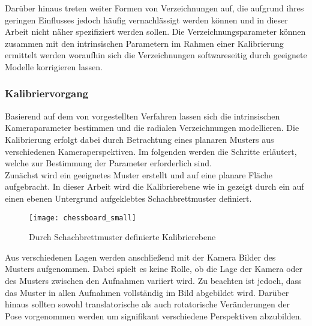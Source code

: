 
Darüber hinaus treten weiter Formen von Verzeichnungen auf, die aufgrund ihres geringen Einflusses jedoch häufig vernachlässigt werden können und in dieser Arbeit nicht näher spezifiziert werden sollen. Die Verzeichnungsparameter können zusammen mit den intrinsischen Parametern im Rahmen einer Kalibrierung ermittelt werden woraufhin sich die Verzeichnungen softwareseitig durch geeignete Modelle korrigieren lassen. 

\subsubsection{Kalibriervorgang}
Basierend auf dem von  vorgestellten Verfahren lassen sich die intrinsischen Kameraparameter bestimmen und die radialen Verzeichnungen modellieren. Die Kalibrierung erfolgt dabei durch Betrachtung eines planaren Musters aus verschiedenen Kameraperspektiven. Im folgenden werden die Schritte erläutert, welche zur Bestimmung der Parameter erforderlich sind.\\

Zunächst wird ein geeignetes Muster erstellt und auf eine planare Fläche aufgebracht. In dieser Arbeit wird die Kalibrierebene wie in  gezeigt durch ein auf einen ebenen Untergrund aufgeklebtes Schachbrettmuster definiert.

\begin{figure}[ht]
	\begin{center}
		\texttt{[image: chessboard\_small]}
		\caption{Durch Schachbrettmuster definierte Kalibrierebene}
		\label{fig.chesscalib}
	\end{center}
\end{figure}

Aus verschiedenen Lagen werden anschließend mit der Kamera Bilder des Musters aufgenommen. Dabei spielt es keine Rolle, ob die Lage der Kamera oder des Musters zwischen den Aufnahmen variiert wird. Zu beachten ist jedoch, dass das Muster in allen Aufnahmen vollständig im Bild abgebildet wird. Darüber hinaus sollten sowohl translatorische als auch rotatorische Veränderungen der Pose vorgenommen werden um signifikant verschiedene Perspektiven abzubilden.\\


